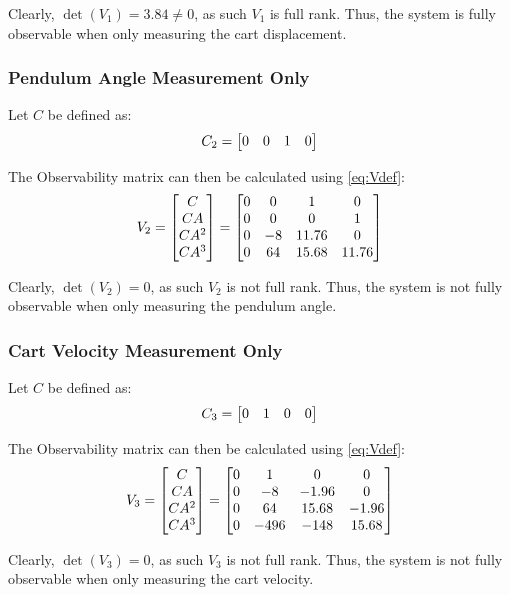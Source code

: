 \documentclass[]{article}
\begin{document}
			Clearly, $\det(V_1) = 3.84 \neq 0$, as such $V_1$ is full rank. Thus, the system is fully observable when only measuring the cart displacement.
		
		\subsubsection{Pendulum Angle Measurement Only}
			Let $C$ be defined as:
			\begin{equation}
				C_2 = \mqty[0	&0	&1	&0]
			\end{equation}
			
			The Observability matrix can then be calculated using \eqref{eq:Vdef}:
			\begin{equation}
				V_2 = \mqty[C\\ CA\\ CA^2\\ CA^3]
				= \mqty[0	&0	&1		&0\\
						0	&0	&0		&1\\
						0	&-8	&11.76	&0\\
						0	&64	&15.68	&11.76] \label{eq:v2def}
			\end{equation}
			
			Clearly, $\det(V_2) = 0$, as such $V_2$ is not full rank. Thus, the system is not fully observable when only measuring the pendulum angle.
		
		\subsubsection{Cart Velocity Measurement Only}
			Let $C$ be defined as:
			\begin{equation}
				C_3 = \mqty[0	&1	&0	&0]
			\end{equation}
			
			The Observability matrix can then be calculated using \eqref{eq:Vdef}:
			\begin{equation}
				V_3 = \mqty[C\\ CA\\ CA^2\\ CA^3]
				= \mqty[0	&1		&0		&0\\
						0	&-8		&-1.96	&0\\
						0	&64		&15.68	&-1.96\\
						0	&-496	&-148	&15.68]\label{eq:v3def}
			\end{equation}
			
			Clearly, $\det(V_3) = 0$, as such $V_3$ is not full rank. Thus, the system is not fully observable when only measuring the cart velocity.
			
\end{document}
